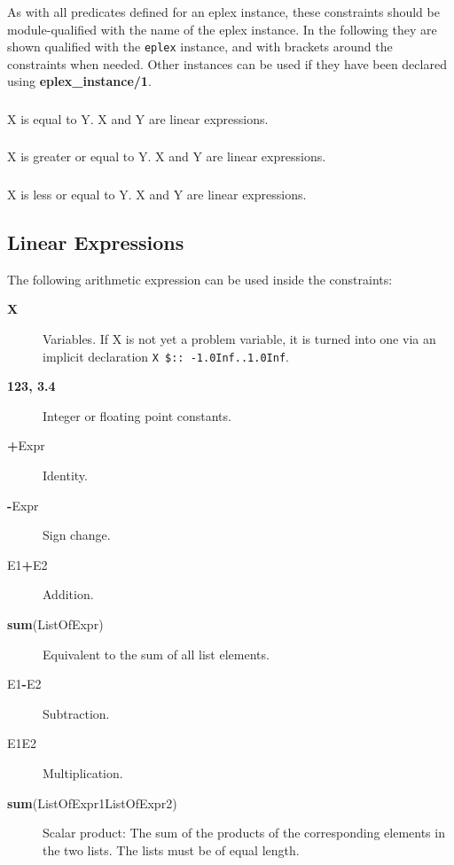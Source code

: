 As with all predicates defined for an eplex instance, these constraints
should be module-qualified with the name of the eplex instance. In the 
following they are shown qualified with the {\tt eplex} instance, and with 
brackets around the constraints when needed. Other instances can
be used if they have been declared using {\bf eplex_instance/1}. 
 
\subsubsection{}
 X is equal to Y. X and Y are linear expressions.

\subsubsection{}
 X is greater or equal to Y. X and Y are linear expressions.

\subsubsection{}
 X is less or equal to Y. X and Y are linear expressions.


\subsection{Linear Expressions}

The following arithmetic expression can be used inside the constraints:
\begin{description}
\item[{\bf X}]
Variables. If X is not yet a problem variable, it is turned into one
	via an implicit declaration {\tt X\ \$::\ -1.0Inf..1.0Inf}.

\item[{\bf 123, 3.4}]
Integer or floating point constants.

\item[{\bf +}Expr]
Identity.

\item[{\bf -}Expr]
Sign change.

\item[E1{\bf +}E2]
Addition.

\item[{\bf sum}(ListOfExpr)]
Equivalent to the sum of all list elements.

\item[E1{\bf -}E2]
Subtraction.

\item[E1{\bf *}E2]
Multiplication.

\item[{\bf sum}(ListOfExpr1{\bf *}ListOfExpr2)]
Scalar product: The sum of the products of the corresponding
elements in the two lists.  The lists must be of equal length.
\end{description}

